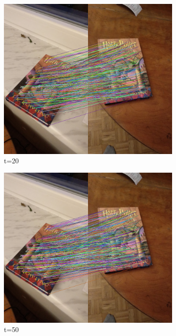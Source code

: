 \documentclass{article}
\begin{document}
\begin{figure}[H]
		\begin{subfigure}[b]{0.4\linewidth}
			\includegraphics[width=\linewidth]{p20m.png}
			\caption{t=20}
		\end{subfigure}
		\begin{subfigure}[b]{0.4\linewidth}
			\includegraphics[width=\linewidth]{p50m.png}
			\caption{t=50}
		\end{subfigure}
		\begin{subfigure}[b]{0.4\linewidth}

\end{subfigure}
\end{figure}
\end{document}
